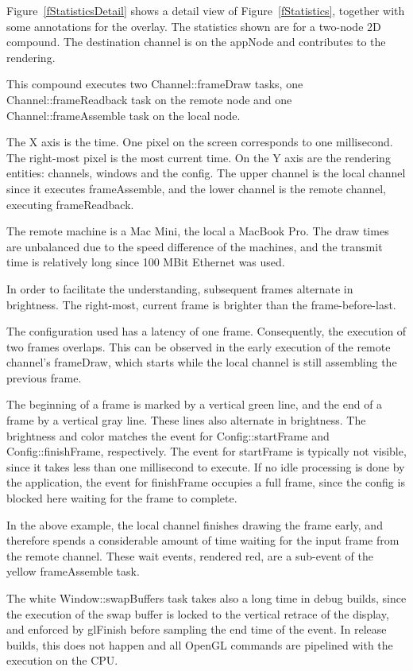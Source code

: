 \documentclass[10pt,a4]{scrartcl}
\newcommand{\fig}[1]{Figure~\ref{#1}}
\begin{document}
\fig{fStatisticsDetail} shows a detail view of \fig{fStatistics},
together with some annotations for the overlay. The statistics shown are
for a two-node 2D compound. The destination channel is on the
\textsf{appNode} and contributes to the rendering.

This compound executes two \textsf{Channel::frameDraw} tasks, one
\textsf{Channel::frame\-Read\-back} task on the remote node and one
\textsf{Channel::frameAssemble} task on the local node.

The X axis is the time. One pixel on the screen corresponds to one
millisecond. The right-most pixel is the most current time. On the Y
axis are the rendering entities: channels, windows and the config. The
upper channel is the local channel since it executes
\textsf{frameAssemble}, and the lower channel is the remote channel,
executing {frameReadback}.

The remote machine is a Mac Mini, the local a MacBook Pro. The draw
times are unbalanced due to the speed difference of the machines, and
the transmit time is relatively long since 100 MBit Ethernet was used.

In order to facilitate the understanding, subsequent frames alternate in
brightness. The right-most, current frame is brighter than the
frame-before-last.

The configuration used has a latency of one frame. Consequently, the
execution of two frames overlaps. This can be observed in the early
execution of the remote channel's \textsf{frameDraw}, which starts while
the local channel is still assembling the previous frame.

The beginning of a frame is marked by a vertical green line, and the end
of a frame by a vertical gray line. These lines also alternate in
brightness. The brightness and color matches the event for
\textsf{Config::startFrame} and \textsf{Config::finishFrame},
respectively. The event for \textsf{startFrame} is typically not
visible, since it takes less than one millisecond to execute. If no idle
processing is done by the application, the event for
\textsf{finishFrame} occupies a full frame, since the config is blocked
here waiting for the frame to complete.

In the above example, the local channel finishes drawing the frame
early, and therefore spends a considerable amount of time waiting for
the input frame from the remote channel. These wait events, rendered
red, are a sub-event of the yellow \textsf{frameAssemble} task.

The white \textsf{Window::swapBuffers} task takes also a long time in
debug builds, since the execution of the swap buffer is locked to the
vertical retrace of the display, and enforced by \textsf{glFinish}
before sampling the end time of the event. In release builds, this does
not happen and all OpenGL commands are pipelined with the execution on
the CPU.

{\footnotesize\begin{lstlisting}
\end{lstlisting}}
\fi
\end{document}
